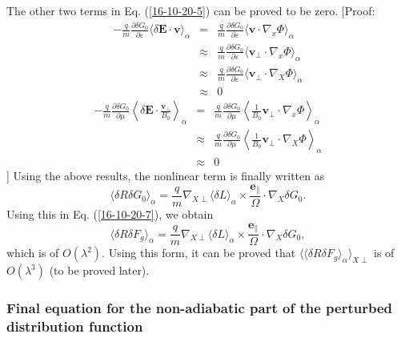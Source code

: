 \documentclass{article}
\newcommand{\tmmathbf}[1]{\ensuremath{\boldsymbol{#1}}}
\begin{document}
The other two terms in Eq. (\ref{16-10-20-5}) can be proved to be zero.
[Proof:
\begin{eqnarray}
  - \frac{q}{m}  \frac{\partial \delta G_0}{\partial \varepsilon} \langle
  \delta \mathbf{E} \cdot \mathbf{v} \rangle_{\alpha} & = & \frac{q}{m} 
  \frac{\partial \delta G_0}{\partial \varepsilon} \langle \mathbf{v} \cdot
  \nabla_x \Phi \rangle_{\alpha} \nonumber\\
  & \approx & \frac{q}{m}  \frac{\partial \delta G_0}{\partial \varepsilon}
  \langle \mathbf{v}_{\perp} \cdot \nabla_x \Phi \rangle_{\alpha} \nonumber\\
  & \approx & \frac{q}{m}  \frac{\partial \delta G_0}{\partial \varepsilon}
  \langle \mathbf{v}_{\perp} \cdot \nabla_X \Phi \rangle_{\alpha} \nonumber\\
  & \approx & 0 
\end{eqnarray}
\begin{eqnarray}
  - \frac{q}{m}  \frac{\partial \delta G_0}{\partial \mu} \left\langle \delta
  \mathbf{E} \cdot \frac{\mathbf{v}_{\perp}}{B_0} \right\rangle_{\alpha} & = &
  \frac{q}{m}  \frac{\partial \delta G_0}{\partial \mu} \left\langle
  \frac{1}{B_0} \mathbf{v}_{\perp} \cdot \nabla_x \Phi \right\rangle_{\alpha}
  \nonumber\\
  & \approx & \frac{q}{m}  \frac{\partial \delta G_0}{\partial \mu}
  \left\langle \frac{1}{B_0} \mathbf{v}_{\perp} \cdot \nabla_X \Phi
  \right\rangle_{\alpha} \nonumber\\
  & \approx & 0 
\end{eqnarray}
] Using the above results, the nonlinear term is finally written as
\begin{equation}
  \langle \delta R \delta G_0 \rangle_{\alpha} = \frac{q}{m} \nabla_{X \perp}
  \langle \delta L \rangle_{\alpha} \times
  \frac{\tmmathbf{e}_{\parallel}}{\Omega} \cdot \nabla_X \delta G_0 .
\end{equation}
Using this in Eq. (\ref{16-10-20-7}), we obtain
\begin{equation}
  \langle \delta R \delta F_g \rangle_{\alpha} = \frac{q}{m} \nabla_{X \perp}
  \langle \delta L \rangle_{\alpha} \times
  \frac{\tmmathbf{e}_{\parallel}}{\Omega} \cdot \nabla_X \delta G_0,
\end{equation}
which is of $O (\lambda^2)$. Using this form, it can be proved that $\langle
\langle \delta R \delta F_g \rangle_{\alpha} \rangle_{X \perp}$ is of $O
(\lambda^3)$ (to be proved later).

\subsubsection{Final equation for the non-adiabatic part of the perturbed
distribution function}
\end{document}
